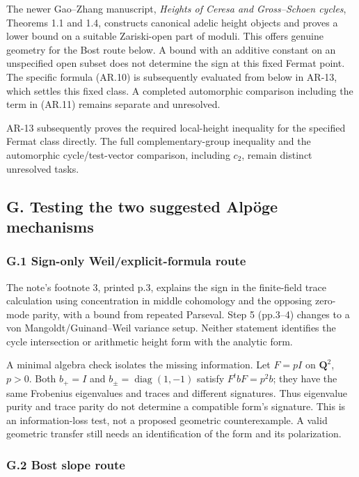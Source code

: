 \documentclass[11pt,a4paper]{article}
\begin{document}
The newer Gao--Zhang manuscript, \emph{Heights of Ceresa and
Gross--Schoen cycles}, Theorems 1.1 and 1.4, constructs canonical adelic
height objects and proves a lower bound on a suitable Zariski-open part
of moduli. This offers genuine geometry for the Bost route below. A
bound with an additive constant on an unspecified open subset does not
determine the sign at this fixed Fermat point. The specific formula
(AR.10) is subsequently evaluated from below in AR-13, which settles
this fixed class. A completed automorphic comparison including the term
in (AR.11) remains separate and unresolved.

AR-13 subsequently proves the required local-height inequality for the
specified Fermat class directly. The full complementary-group inequality
and the automorphic cycle/test-vector comparison, including \(c_2\),
remain distinct unresolved tasks.

\subsection{G. Testing the two suggested Alpöge
mechanisms}\label{g.-testing-the-two-suggested-alpuxf6ge-mechanisms}

\subsubsection{G.1 Sign-only Weil/explicit-formula
route}\label{g.1-sign-only-weilexplicit-formula-route}

The note's footnote 3, printed p.3, explains the sign in the
finite-field trace calculation using concentration in middle cohomology
and the opposing zero-mode parity, with a bound from repeated Parseval.
Step 5 (pp.3--4) changes to a von Mangoldt/Guinand--Weil variance setup.
Neither statement identifies the cycle intersection or arithmetic height
form with the analytic form.

A minimal algebra check isolates the missing information. Let \(F=pI\)
on \(\mathbf Q^2\), \(p>0\). Both \(b_+=I\) and
\(b_\pm=\operatorname{diag}(1,-1)\) satisfy \(F^tbF=p^2b\); they have
the same Frobenius eigenvalues and traces and different signatures. Thus
eigenvalue purity and trace parity do not determine a compatible form's
signature. This is an information-loss test, not a proposed geometric
counterexample. A valid geometric transfer still needs an identification
of the form and its polarization.

\subsubsection{G.2 Bost slope route}\label{g.2-bost-slope-route}
\end{document}
